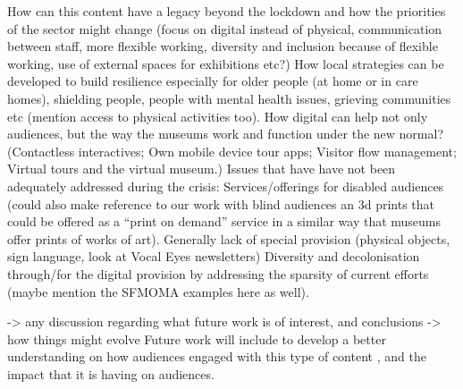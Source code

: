 \documentclass{egpubl}
\begin{document}
How can this content have a legacy beyond the lockdown and how the priorities of the sector might change (focus on digital instead of physical, communication between staff, more flexible working, diversity and inclusion because of flexible working, use of external spaces for exhibitions etc?)
How local strategies can be developed to build resilience especially for older people (at home or in care homes), shielding people, people with mental health issues, grieving communities etc (mention access to physical activities too). 
How digital can help not only audiences, but the way the museums work and function under the new normal? (Contactless interactives; Own mobile device tour apps; Visitor flow management; Virtual tours and the virtual museum.)
Issues that have have not been adequately addressed during the crisis:
Services/offerings for disabled audiences (could also make reference to our work with blind audiences an 3d prints that could be offered as a “print on demand” service in a similar way that museums offer prints of works of art). Generally lack of special provision (physical objects, sign language, look at Vocal Eyes newsletters)
Diversity and decolonisation through/for the digital provision by addressing the sparsity of current efforts (maybe mention the SFMOMA examples here as well).

-> any discussion regarding what future work is of interest, and conclusions
->  how things might evolve
Future work will include to develop a better  understanding on how audiences engaged with this type of content  , and the impact that it is having on audiences. 







  
        


\end{document}
